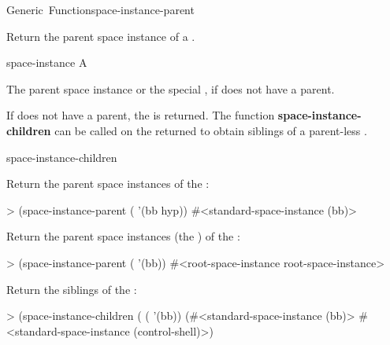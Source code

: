 \documentclass[10pt,twoside,english,pdftex]{article}
\begin{document}
\begin{functiondoc}{Generic~Function}{space-instance-parent}%
  {
    \returns{} }
%

\fnsyntax

\fnpurpose Return the parent space instance of a .

\fnmethods
{}%
  {\code{(} 
    \returns{} }

\fnpackage {}

\fnmodule {}

\fnargs
\begin{args}{space-instance}
 A 
\end{args}

\fnreturns The parent space instance or the special
, if  does not have a
parent.

\fndescription If  does not have a parent, the
 is returned.  The function
\textbf{space-instance-children} can be called on the returned
 to obtain siblings of a parent-less
.

\begin{alsos}{space-instance-children}
\end{alsos}

\fnexamples
{}%
%
Return the parent space instances of the  
:
\begin{example}
> (space-instance-parent ( '(bb hyp))
#<standard-space-instance (bb)>
\end{example}

Return the parent space instances (the ) of
the  :
\begin{example}
> (space-instance-parent ( '(bb))
#<root-space-instance root-space-instance>
\end{example}

Return the siblings of the  :
\begin{example}
> (space-instance-children
    ( ( '(bb))
(#<standard-space-instance (bb)>
 #<standard-space-instance (control-shell)>)
\end{example}

\end{functiondoc}
\end{document}
